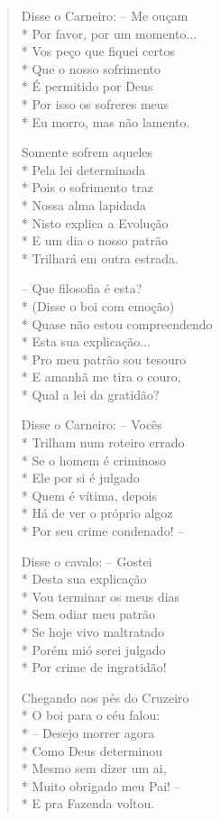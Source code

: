 \begin{verse}
Disse o Carneiro: --  Me ouçam\\*
Por favor, por um momento...\\*
Vos peço que fiquei certos\\*
Que o nosso sofrimento\\*
É permitido por Deus\\*
Por isso os sofreres meus\\*
Eu morro, mas não lamento.

Somente sofrem aqueles\\*
Pela lei determinada\\*
Pois o sofrimento traz\\*
Nossa alma lapidada\\*
Nisto explica a Evolução\\*
E um dia o nosso patrão\\*
Trilhará em outra estrada.

--  Que filosofia é esta?\\*
(Disse o boi com emoção)\\*
Quase não estou compreendendo\\*
Esta sua explicação...\\*
Pro meu patrão sou tesouro\\*
E amanhã me tira o couro,\\*
Qual a lei da gratidão?

Disse o Carneiro: --  Vocês\\*
Trilham num roteiro errado\\*
Se o homem é criminoso\\*
Ele por si é julgado\\*
Quem é vítima, depois\\*
Há de ver o próprio algoz\\*
Por seu crime condenado! --

Disse o cavalo: --  Gostei\\*
Desta sua explicação\\*
Vou terminar os meus dias\\*
Sem odiar meu patrão\\*
Se hoje vivo maltratado\\*
Porém mió serei julgado\\*
Por crime de ingratidão!

Chegando aos pés do Cruzeiro\\*
O boi para o céu falou:\\*
--  Desejo morrer agora\\*
Como Deus determinou\\*
Mesmo sem dizer um ai,\\*
Muito obrigado meu Pai! --\\*
E pra Fazenda voltou.


\end{verse}
